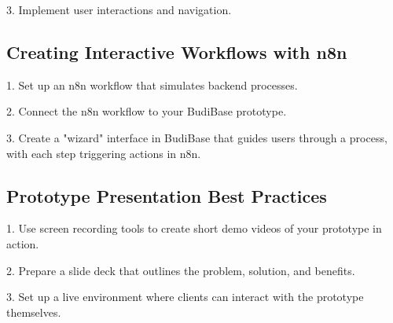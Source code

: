 3. Implement user interactions and navigation.


\subsection{Creating Interactive Workflows with n8n}

1. Set up an n8n workflow that simulates backend processes.


2. Connect the n8n workflow to your BudiBase prototype.


3. Create a "wizard" interface in BudiBase that guides users through a process, with each step triggering actions in n8n.


\subsection{Prototype Presentation Best Practices}

1. Use screen recording tools to create short demo videos of your prototype in action.

2. Prepare a slide deck that outlines the problem, solution, and benefits.

3. Set up a live environment where clients can interact with the prototype themselves.

